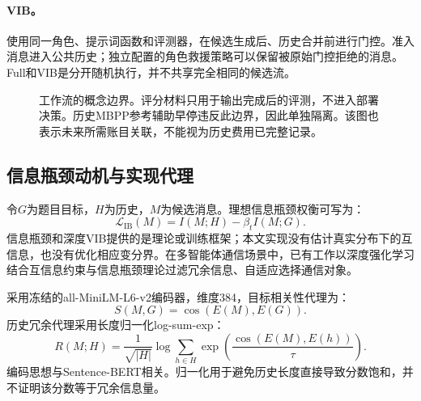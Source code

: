 \documentclass[11pt,a4paper]{article}
\begin{document}
\paragraph{VIB。}
使用同一角色、提示词函数和评测器，在候选生成后、历史合并前进行门控。准入消息进入公共历史；独立配置的角色救援策略可以保留被原始门控拒绝的消息。Full和VIB是分开随机执行，并不共享完全相同的候选流。

\begin{figure}[ht]
\centering
{}
\caption{工作流的概念边界。评分材料只用于输出完成后的评测，不进入部署决策。历史MBPP参考辅助早停违反此边界，因此单独隔离。该图也表示未来所需账目关联，不能视为历史费用已完整记录。\label{fig:pipeline}}
\end{figure}

\subsection{信息瓶颈动机与实现代理}
令$G$为题目目标，$H$为历史，$M$为候选消息。理想信息瓶颈权衡可写为：
\begin{equation}
\mathcal L_{\mathrm{IB}}(M)=I(M;H)-\beta_t I(M;G).
\end{equation}
信息瓶颈和深度VIB提供的是理论或训练框架\citep{tishby2015deep,alemi2017variational}；本文实现没有估计真实分布下的互信息，也没有优化相应变分界。在多智能体通信场景中，已有工作以深度强化学习结合互信息约束与信息瓶颈理论过滤冗余信息、自适应选择通信对象\citep{gao2024info}。

采用冻结的all-MiniLM-L6-v2编码器，维度384，目标相关性代理为：
\begin{equation}
S(M,G)=\cos(E(M),E(G)).
\end{equation}
历史冗余代理采用长度归一化log-sum-exp：
\begin{equation}
R(M;H)=\frac{1}{\sqrt{|H|}}
  \log\sum_{h\in H}\exp\!\left(\frac{\cos(E(M),E(h))}{\tau}\right).
\end{equation}
编码思想与Sentence-BERT相关\citep{reimers2019sentence}。归一化用于避免历史长度直接导致分数饱和，并不证明该分数等于冗余信息量。
\end{document}
